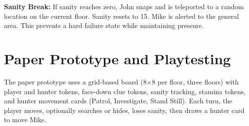 \documentclass[12pt, letterpaper]{article}
\begin{document}
\textbf{Sanity Break:} If sanity reaches zero, John snaps and is teleported to a random location on the current floor. Sanity resets to 15. Mike is alerted to the general area. This prevents a hard failure state while maintaining pressure.

\section{Paper Prototype and Playtesting}

The paper prototype uses a grid-based board (8$\times$8 per floor, three floors) with player and hunter tokens, face-down clue tokens, sanity tracking, stamina tokens, and hunter movement cards (Patrol, Investigate, Stand Still). Each turn, the player moves, optionally searches or hides, loses sanity, then draws a hunter card to move Mike.
\end{document}
